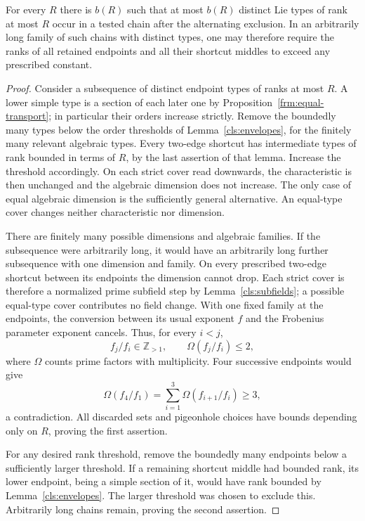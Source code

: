 \begin{lemma}\label{cls:bounded-rank}
For every $R$ there is $b(R)$ such that at most $b(R)$ distinct Lie
types of rank at most $R$ occur in a tested chain after the alternating
exclusion.  In an arbitrarily long family of such chains with distinct
types, one may therefore require the ranks of all retained endpoints
and all their shortcut middles to exceed any prescribed constant.
\end{lemma}
\begin{proof}
Consider a subsequence of distinct endpoint types of ranks at most
$R$.  A lower simple type is a section of each later one by
Proposition~\ref{frm:equal-transport}; in particular their orders increase strictly.
Remove the boundedly many types below the order thresholds of
Lemma~\ref{cls:envelopes}, for the finitely many relevant algebraic
types.  Every two-edge shortcut has intermediate types of rank
bounded in terms of $R$, by the last assertion of that lemma.
Increase the threshold accordingly.  On each strict cover read
downwards, the characteristic is then unchanged and the algebraic
dimension does not increase.  The only case of equal algebraic
dimension is the sufficiently general alternative.  An equal-type
cover changes neither characteristic nor dimension.

There are finitely many possible dimensions and algebraic families.
If the subsequence were arbitrarily long, it would have an
arbitrarily long further subsequence with one dimension and family.
On every prescribed two-edge shortcut between its endpoints the
dimension cannot drop.  Each strict cover is therefore a normalized
prime subfield step by Lemma~\ref{cls:subfields}; a possible equal-type
cover contributes no field change.  With one fixed family at the
endpoints, the conversion between its usual exponent $f$ and the
Frobenius parameter exponent cancels.  Thus, for every $i<j$,
\[
 f_j/f_i\in\mathbb Z_{>1},\qquad \Omega(f_j/f_i)\leq2,
\]
where $\Omega$ counts prime factors with multiplicity.  Four
successive endpoints would give
\[
 \Omega(f_4/f_1)=\sum_{i=1}^3\Omega(f_{i+1}/f_i)\geq3,
\]
a contradiction.  All discarded sets and pigeonhole choices have
bounds depending only on $R$, proving the first assertion.

For any desired rank threshold, remove the boundedly many endpoints
below a sufficiently larger threshold.  If a remaining shortcut
middle had bounded rank, its lower endpoint, being a simple section
of it, would have rank bounded by Lemma~\ref{cls:envelopes}.  The
larger threshold was chosen to exclude this.  Arbitrarily long
chains remain, proving the second assertion.
\end{proof}

